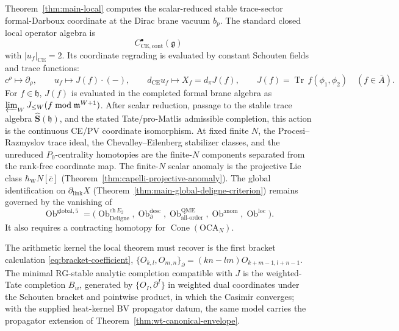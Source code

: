\documentclass[11pt]{memoir}
\begin{document}
Theorem~\ref{thm:main-local} computes the scalar-reduced stable
trace-sector formal-Darboux coordinate at the Dirac brane vacuum
\(b_p\).  The standard closed local operator algebra is
\[
  C^\bullet_{\mathrm{CE},\mathrm{cont}}(\mathfrak g)
\]
with \(|u_f|_{\mathrm{CE}}=2\).  Its coordinate regrading is evaluated
by constant Schouten fields and trace functions:
\[
  c^\rho\mapsto\partial_\rho,\qquad u_f\mapsto J(f)\cdot(-),\qquad
  d_{\mathrm{CE}}u_f\mapsto X_f=d_\pi J(f),\qquad
  J(f)=\operatorname{Tr}\,f(\phi_1,\phi_2)\quad(f\in\bar A).
\]
For \(f\in\mathfrak h\), \(J(f)\) is evaluated in the completed formal
brane algebra as
\(\varprojlim_WJ_{\leq W}(f\bmod\mathfrak m^{W+1})\).  After scalar
reduction, passage to the stable trace
algebra \(\widehat{\mathbf S}(\mathfrak h)\), and the stated
Tate/pro-Matlis admissible completion, this action is the continuous
CE/PV coordinate isomorphism.  At fixed finite \(N\), the
Procesi--Razmyslov trace ideal, the Chevalley--Eilenberg stabilizer
classes, and the unreduced \(P_0\)-centrality homotopies are the
  finite-\(N\) components separated from the rank-free coordinate map.  The
finite-\(N\) scalar anomaly is the projective Lie class
\(\hbar_{\mathrm{W}}N[\bar c]\)
(Theorem~\ref{thm:capelli-projective-anomaly}).  The global
identification on \(\partial_{\mathrm{link}}X\)
(Theorem~\ref{thm:main-global-deligne-criterion}) remains governed by
the vanishing of
\[
  \operatorname{Ob}^{\mathrm{global},5}
  =
  \bigl(
  \operatorname{Ob}^{\mathrm{ch}\,E_2}_{\mathrm{Deligne}},
  \operatorname{Ob}^{\mathrm{desc}}_{\partial},
  \operatorname{Ob}^{\mathrm{QME}}_{\mathrm{all\mbox{-}order}},
  \operatorname{Ob}^{\mathrm{anom}},
  \operatorname{Ob}^{\mathrm{loc}}
  \bigr).
\]
It also requires a contracting homotopy for
\(\operatorname{Cone}(\mathrm{OCA}_N)\).

The arithmetic kernel the local theorem must recover is the first
bracket calculation \eqref{eq:bracket-coefficient},
\(\{O_{k,l},O_{m,n}\}_\partial=(kn-lm)O_{k+m-1,l+n-1}\).  The minimal
RG-stable analytic completion compatible with \(J\) is the weighted-Tate
completion \(B_w\), generated by
\(\{O_I,\partial^I\}\) in weighted dual coordinates under the Schouten bracket and
pointwise product, in which the Casimir converges; with the supplied
heat-kernel BV propagator datum, the same model carries the propagator
extension of Theorem~\ref{thm:wt-canonical-envelope}.
\end{document}
